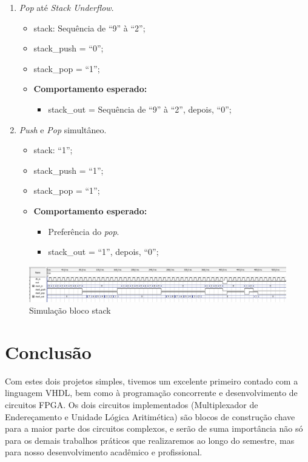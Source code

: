 \documentclass{article}
\begin{document}
\begin{enumerate}
    \item \textit{Pop} até \textit{Stack Underflow}.
    \begin{itemize}
        \item stack: Sequência de ``9'' à ``2'';
        \item stack\_push = ``0'';
        \item stack\_pop = ``1'';
        \item \textbf{Comportamento esperado:}
        \begin{itemize}
            \item stack\_out = Sequência de ``9'' à ``2'', depois, ``0'';
        \end{itemize}
    \end{itemize}

    \item \textit{Push} e \textit{Pop} simultâneo.
    \begin{itemize}
        \item stack: ``1'';
        \item stack\_push = ``1'';
        \item stack\_pop = ``1'';
        \item \textbf{Comportamento esperado:}
        \begin{itemize}
            \item Preferência do \textit{pop}.
            \item stack\_out = ``1'', depois, ``0'';
        \end{itemize}
    \end{itemize}
\end{enumerate}

\begin{figure}[ht]
    \begin{center}
        \includegraphics[width=15cm]{images/stack.png}
        \caption{Simulação bloco stack}
\end{center}
\end{figure}

\newpage

\section{Conclusão}
Com estes dois projetos simples, tivemos um excelente primeiro contado com a linguagem VHDL, bem como à programação concorrente e desenvolvimento de circuitos FPGA. Os dois circuitos implementados (Multiplexador de Endereçamento e Unidade Lógica Aritimética) são blocos de construção chave para a maior parte dos circuitos complexos, e serão de suma importância não só para os demais trabalhos práticos que realizaremos ao longo do semestre, mas para nosso desenvolvimento acadêmico e profissional.
\end{document}
